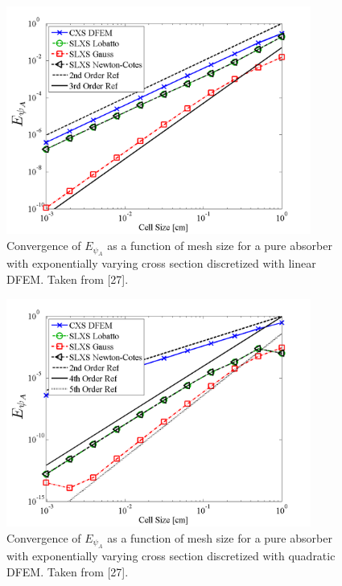 \begin{figure}[!htp]
\centering
\includegraphics[width=10cm]{chapter3_variable_xs/P1_VarXS_E_psi_A.png}
\caption{Convergence of $E_{\psi_A}$   as a function of mesh size for a pure absorber with exponentially varying cross section discretized with linear DFEM.  Taken from [27].}
\label{fig:varxs_psi_A_p1}
\end{figure}
%
\begin{figure}[!hbp]
\centering
\includegraphics[width=10cm]{chapter3_variable_xs/P2_VarXS_E_psi_A.png}
\caption{Convergence of $E_{\psi_A}$  as a function of mesh size for a pure absorber with exponentially varying cross section discretized with quadratic DFEM.  Taken from [27].}
\label{fig:varxs_psi_A_p2}
\end{figure}
%


